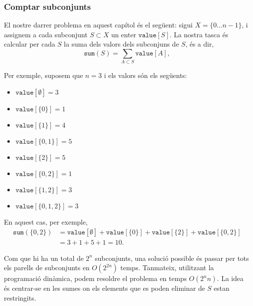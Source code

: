 \subsubsection{Comptar subconjunts}

El nostre darrer problema en aquest capítol és el següent:
sigui $X=\{0 \ldots n-1\}$, i assignem a cada subconjunt $S \subset X$
un enter $\texttt{value}[S]$. La nostra tasca és calcular per cada $S$
la suma dels valors dels subconjuns de $S$, és a dir,
\[\texttt{sum}(S) = \sum_{A \subset S} \texttt{value}[A],\]

Per exemple, suposem que $n=3$ i els valors són els següents:
\begin{multicols}{2}
\begin{itemize}
\item $\texttt{value}[\emptyset] = 3$
\item $\texttt{value}[\{0\}] = 1$
\item $\texttt{value}[\{1\}] = 4$
\item $\texttt{value}[\{0,1\}] = 5$
\item $\texttt{value}[\{2\}] = 5$
\item $\texttt{value}[\{0,2\}] = 1$
\item $\texttt{value}[\{1,2\}] = 3$
\item $\texttt{value}[\{0,1,2\}] = 3$
\end{itemize}
\end{multicols}
En aquest cas, per exemple,
\begin{equation*}
\begin{split}
\texttt{sum}(\{0,2\}) &= \texttt{value}[\emptyset]+\texttt{value}[\{0\}]+\texttt{value}[\{2\}]+\texttt{value}[\{0,2\}] \\ 
                      &= 3 + 1 + 5 + 1 = 10.
\end{split}
\end{equation*}


Com que hi ha un total de $2^n$ subconjunts, una solució possible és
passar per tots els parells de subconjunts en $O(2^{2n})$
temps. Tanmateix, utilitzant la programació dinàmica, podem resoldre
el problema en temps $O(2^n n)$. La idea és centrar-se en les sumes on els
elements que es poden eliminar de $S$ estan restringits.

